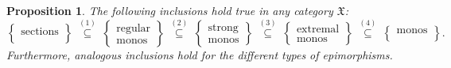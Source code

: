 \documentclass[12pt]{article}
\newtheorem{proposition}[lemma]{Proposition}
\theoremstyle{definition}
\def\X{\mathfrak X}
\numberwithin{equation}{section}
\begin{document}
\begin{proposition}\label{quanti:tipi:mono:ci sono}
The following inclusions hold true in any category $\X$:
\[
\left\{ \begin{matrix}\text{sections}\\ \ \end{matrix}\right\}\ \overset{(1)}\subseteq\ \left\{ \begin{matrix}\text{regular}\\\text{monos}\end{matrix}\right\}\ \overset{(2)}\subseteq\ \left\{ \begin{matrix}\text{strong}\\\text{monos}\end{matrix}\right\}\ \overset{(3)}\subseteq\ \left\{ \begin{matrix}\text{extremal}\\\text{monos}\end{matrix}\right\}\ \overset{(4)}\subseteq\ \left\{ \begin{matrix}\text{monos}\\ \ \end{matrix}\right\}.
\]
Furthermore, analogous inclusions hold for the different types of epimorphisms.
\end{proposition}
\end{document}
